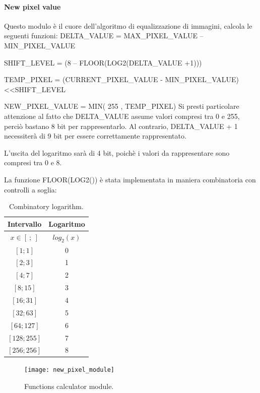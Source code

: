 \paragraph{New pixel value}

Questo modulo è il cuore dell'algoritmo di equalizzazione di immagini, calcola le seguenti funzioni:
\doublespacing
\singlespacing
DELTA\_VALUE = MAX\_PIXEL\_VALUE – MIN\_PIXEL\_VALUE

SHIFT\_LEVEL = (8 – FLOOR(LOG2(DELTA\_VALUE +1)))

TEMP\_PIXEL = (CURRENT\_PIXEL\_VALUE - MIN\_PIXEL\_VALUE) \textless\textless  SHIFT\_LEVEL

NEW\_PIXEL\_VALUE = MIN( 255 , TEMP\_PIXEL)
\doublespacing
\singlespacing
Si presti particolare attenzione al fatto che DELTA\_VALUE assume valori compresi tra 0 e 255, perciò bastano 8 bit per rappresentarlo. Al contrario, DELTA\_VALUE + 1 necessiterà di 9 bit per essere correttamente rappresentato.

L'uscita del logaritmo sarà di 4 bit, poichè i valori da rappresentare sono compresi tra 0 e 8.

La funzione FLOOR(LOG2()) è stata implementata in maniera combinatoria con controlli a soglia:

\begin{table}[h!]
\centering
\begin{tabular}{| c | c |} 
 \hline
 Intervallo & Logaritmo \\
  \hline
 $x \in [~;~]$ & $log_2(x)$ \\ [0.5ex] 
 \hline\hline
 $[1;1]$ & 0 \\ 
 $[2;3]$ & 1 \\
 $[4;7]$ & 2 \\ 
 $[8;15]$ & 3 \\
 $[16;31]$ & 4 \\
 $[32;63]$ & 5 \\
 $[64;127]$ & 6 \\
 $[128;255]$ & 7 \\
 $[256;256]$ & 8 \\ [1ex] 
 \hline
\end{tabular}
\caption{Combinatory logarithm.}
\end{table}

\begin{figure}[h!] %
  \texttt{[image: new\_pixel\_module]}
  \caption{Functions calculator module.}
  \label{fig:newPixel}
\end{figure}
